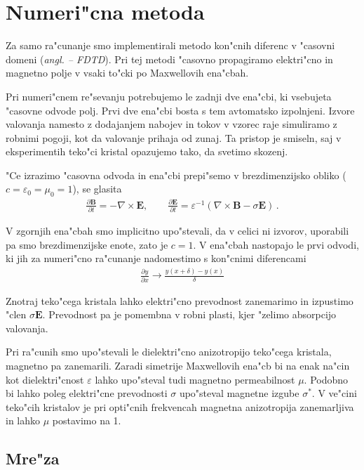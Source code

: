 \documentclass[12pt,twoside,openright,final]{report}
\newcommand{\odvod}[2]{\frac{\partial #1}{\partial #2}}
\renewcommand{\vec}{\mathbf}
\newcommand{\eps}{\varepsilon}
\newcommand{\angl}[1]{(\textit{angl. #1})}
\renewcommand{\acf}[1]{\aclu{#1} -- \acs{#1}}
\begin{document}
\chapter{Numeri"cna metoda}

Za samo ra"cunanje smo implementirali metodo kon"cnih diferenc v "casovni domeni \angl{\acf{FDTD}}\cite{taflove}. 
Pri tej metodi "casovno propagiramo elektri"cno in magnetno polje v vsaki to"cki po Maxwellovih ena"cbah. 

Pri numeri"cnem re"sevanju potrebujemo le zadnji dve ena"cbi, ki vsebujeta "casovne odvode polj. 
Prvi dve ena"cbi bosta s tem avtomatsko izpolnjeni. 
Izvore valovanja namesto z dodajanjem nabojev in tokov v vzorec raje simuliramo z robnimi pogoji, kot da valovanje prihaja od zunaj. 
Ta pristop je smiseln, saj v eksperimentih teko"ci kristal opazujemo tako, da svetimo skozenj. 

"Ce izrazimo "casovna odvoda in ena"cbi prepi"semo v brezdimenzijsko obliko ($c = \varepsilon_0 = \mu_0 = 1$), se glasita
\begin{align}
\label{eq:maxwell-base}
 \odvod{\vec{B}}{t} = -\nabla \times \vec{E}, \qquad \odvod{\vec{E}}{t} = \eps^{-1} (\nabla \times \vec{B} - \sigma \vec E)\,.
\end{align}

V zgornjih ena"cbah smo implicitno upo"stevali, da v celici ni izvorov, uporabili pa smo brezdimenzijske enote, zato je $c=1$.
V ena"cbah nastopajo le prvi odvodi, ki jih za numeri"cno ra"cunanje nadomestimo s kon"cnimi diferencami
\begin{align}
 \frac{\partial y}{\partial x} \rightarrow \frac{y(x+\delta) - y(x)}{\delta}
\end{align}

Znotraj teko"cega kristala lahko elektri"cno prevodnost zanemarimo in izpustimo "clen $\sigma \vec E$. 
Prevodnost pa je pomembna v robni plasti, kjer "zelimo absorpcijo valovanja. 

Pri ra"cunih smo upo"stevali le dielektri"cno anizotropijo teko"cega kristala, magnetno pa zanemarili. 
Zaradi simetrije Maxwellovih ena"cb bi na enak na"cin kot dielektri"cnost $\varepsilon$ lahko upo"steval tudi magnetno permeabilnost $\mu$. 
Podobno bi lahko poleg elektri"cne prevodnosti $\sigma$ upo"steval magnetne izgube $\sigma^*$. 
V ve"cini teko"cih kristalov je pri opti"cnih frekvencah magnetna anizotropija zanemarljiva in lahko $\mu$ postavimo na 1. 

\section{Mre"za}
\end{document}
